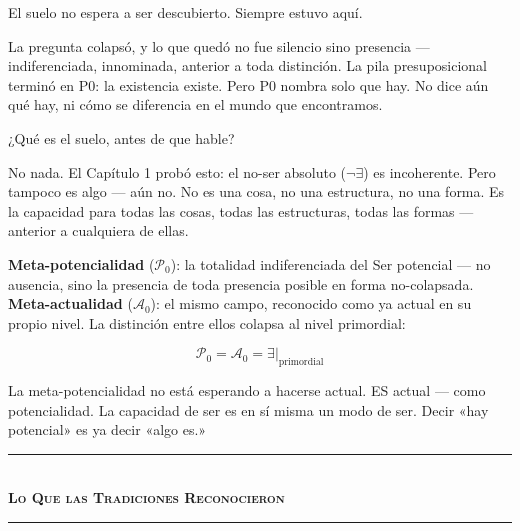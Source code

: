 \documentclass[10pt, openany, oneside]{book}
\renewcommand{\normalsize}{\fontsize{10}{13}\selectfont}
\begin{document}
\vspace{2em}


\noindent El suelo no espera a ser descubierto. Siempre estuvo aquí.

La pregunta colapsó, y lo que quedó no fue silencio sino presencia --- indiferenciada, innominada, anterior a toda distinción. La pila presuposicional terminó en P0: la existencia existe. Pero P0 nombra solo que hay. No dice aún qué hay, ni cómo se diferencia en el mundo que encontramos.

¿Qué es el suelo, antes de que hable?

No nada. El Capítulo 1 probó esto: el no-ser absoluto ($\neg\exists$) es incoherente. Pero tampoco es algo --- aún no. No es una cosa, no una estructura, no una forma. Es la capacidad para todas las cosas, todas las estructuras, todas las formas --- anterior a cualquiera de ellas.

\textbf{Meta-potencialidad} ($\mathcal{P}_0$): la totalidad indiferenciada del Ser potencial --- no ausencia, sino la presencia de toda presencia posible en forma no-colapsada. \textbf{Meta-actualidad} ($\mathcal{A}_0$): el mismo campo, reconocido como ya actual en su propio nivel. La distinción entre ellos colapsa al nivel primordial:

$$\mathcal{P}_0 = \mathcal{A}_0 = \exists|_{\text{primordial}}$$

La meta-potencialidad no está esperando a hacerse actual. ES actual --- como potencialidad. La capacidad de ser es en sí misma un modo de ser. Decir «hay potencial» es ya decir «algo es.»

\vspace{1.5em}


\begin{center}
    \rule{0.3\textwidth}{0.4pt}\\[0.5em]
    {\normalsize\bfseries\scshape Lo Que las Tradiciones Reconocieron}\\[0.3em]
    \rule{0.3\textwidth}{0.4pt}
\end{center}

\vspace{1em}
\end{document}
